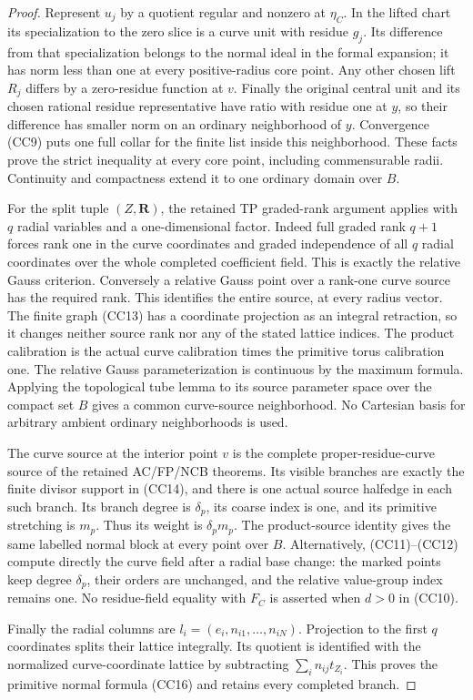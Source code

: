 \begin{proof}
Represent \(u_j\) by a quotient regular and nonzero at
\(\eta_C\).  In the lifted chart its specialization to the zero
slice is a curve unit with residue \(g_j\).  Its difference from
that specialization belongs to the normal ideal in the formal
expansion; it has norm less than one at every positive-radius
core point.  Any other chosen lift \(R_j\) differs by a
zero-residue function at \(v\).  Finally the original central
unit and its chosen rational residue representative have ratio
with residue one at \(y\), so their difference has smaller norm
on an ordinary neighborhood of \(y\).  Convergence (CC9) puts
one full collar for the finite list inside this neighborhood.
These facts prove the strict inequality at every core point, including commensurable radii.  Continuity and compactness
extend it to one ordinary domain over \(B\).

For the split tuple \((Z,\mathbf R)\), the retained TP graded-rank
argument applies with \(q\) radial variables and a one-dimensional
factor.  Indeed full graded rank \(q+1\) forces rank one in the
curve coordinates and graded independence of all \(q\) radial
coordinates over the whole completed coefficient field.  This
is exactly the relative Gauss criterion.  Conversely a relative
Gauss point over a rank-one curve source has the required rank.
This identifies the entire source, at every radius vector.
The finite graph (CC13) has a coordinate projection as an
integral retraction, so it changes neither source rank nor any
of the stated lattice indices.  The product calibration is the
actual curve calibration times the primitive torus calibration
one.  The relative Gauss parameterization is continuous by the
maximum formula.  Applying the topological tube lemma to its
source parameter space over the compact set \(B\) gives a common
curve-source neighborhood.  No Cartesian basis for arbitrary
ambient ordinary neighborhoods is used.

The curve source at the interior point \(v\) is the complete
proper-residue-curve source of the retained AC/FP/NCB theorems.
Its visible branches are exactly the finite divisor support in
(CC14), and there is one actual source halfedge in each such
branch.  Its branch degree is \(\delta_p\), its coarse index is
one, and its primitive stretching is \(m_p\).  Thus its weight
is \(\delta_pm_p\).  The product-source identity gives the same
labelled normal block at every point over \(B\).  Alternatively,
(CC11)--(CC12) compute directly the curve field after a radial
base change: the marked points keep degree \(\delta_p\), their
orders are unchanged, and the relative value-group index remains
one.  No residue-field equality with \(F_C\) is asserted when
\(d>0\) in (CC10).

Finally the radial columns are
\(l_i=(e_i,n_{i1},\ldots,n_{iN})\).  Projection to the first
\(q\) coordinates splits their lattice integrally.  Its quotient
is identified with the normalized curve-coordinate lattice by
subtracting \(\sum_i n_{ij}t_{Z_i}\).  This proves the primitive
normal formula (CC16) and retains every completed branch.
\end{proof}

